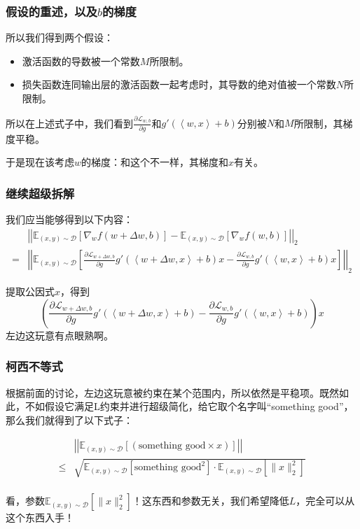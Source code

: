 \documentclass{ctexbeamer}
\begin{document}
\begin{frame}
    \frametitle{假设的重述，以及$b$的梯度}

    所以我们得到两个假设：
    \begin{itemize}
        \item 激活函数的导数被一个常数$M$所限制。
        \item 损失函数连同输出层的激活函数一起考虑时，其导数的绝对值被一个常数$N$所限制。
    \end{itemize}

    所以在上述式子中，我们看到$\frac{\partial \mathcal{L}_{w, b}}{\partial g}$和$g'(\left\langle w, x \right\rangle + b)$分别被$N$和$M$所限制，其梯度平稳。

    于是现在该考虑$w$的梯度：和这个不一样，其梯度和$x$有关。

\end{frame}

\begin{frame}
    \frametitle{继续超级拆解}

    我们应当能够得到以下内容：
    \begin{align}
        & \left|\left|\mathbb{E}_{(x,y) \sim \mathcal{D}}[\nabla_w f(w+\Delta w, b)] - \mathbb{E}_{(x,y) \sim \mathcal{D}}[\nabla_w f(w, b)]  \right|\right|_2 \\
        =& \left|\left|\mathbb{E}_{(x,y) \sim \mathcal{D}}\left[\frac{\partial \mathcal{L}_{w+\Delta w, b}}{\partial g}g'(\left\langle w+\Delta w, x \right\rangle + b) x - \frac{\partial \mathcal{L}_{w, b}}{\partial g}g'(\left\langle w, x \right\rangle + b) x\right]  \right|\right|_2
    \end{align}

    提取公因式$x$，得到
    \begin{equation}
        \left(\frac{\partial \mathcal{L}_{w+\Delta w, b}}{\partial g}g'(\left\langle w+\Delta w, x \right\rangle + b) - \frac{\partial \mathcal{L}_{w, b}}{\partial g}g'(\left\langle w, x \right\rangle + b)\right) x
    \end{equation}
    左边这玩意有点眼熟啊。

\end{frame}

\begin{frame}
    \frametitle{柯西不等式}

    根据前面的讨论，左边这玩意被约束在某个范围内，所以依然是平稳项。既然如此，不如假设它满足L约束并进行超级简化，给它取个名字叫“something good”，那么我们就得到了以下式子：

    \begin{align}
& \left|\left|\mathbb{E}_{(x,y) \sim \mathcal{D}}\left[(\text{something good} \times x)\right]\right|\right| \\
\leqslant & \sqrt{\mathbb{E}_{(x,y) \sim \mathcal{D}}[\text{something good}^2] \cdot \mathbb{E}_{(x,y) \sim \mathcal{D}}[\|x\|_2^2]} \\
    \end{align}

    看，参数$\mathbb{E}_{(x,y) \sim \mathcal{D}}[\|x\|_2^2]$！这东西和参数无关，我们希望降低$L$，完全可以从这个东西入手！

\end{frame}
\end{document}
